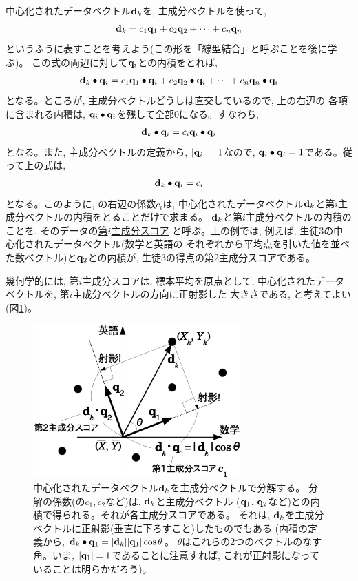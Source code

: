 中心化されたデータベクトル${\bf d}_k$を, 主成分ベクトルを使って, 
\begin{eqnarray}
{\bf d}_k=c_1{\bf q}_1+c_2{\bf q}_2+\cdots+c_n{\bf q}_n\label{eq:PCA_lincomp}
\end{eqnarray}
というふうに表すことを考えよう(この形を「線型結合」と呼ぶことを後に学ぶ)。
この式の両辺に対して${\bf q}_i$との内積をとれば, 
\begin{eqnarray}
{\bf d}_k\bullet {\bf q}_i=c_1{\bf q}_1\bullet {\bf q}_i+c_2{\bf q}_2\bullet {\bf q}_i+\cdots+c_n{\bf q}_n\bullet {\bf q}_i\nonumber\\
\end{eqnarray}
となる。ところが, 主成分ベクトルどうしは直交しているので, 上の右辺の
各項に含まれる内積は, ${\bf q}_i\bullet {\bf q}_i$を残して全部0になる。すなわち, 
\begin{eqnarray}
{\bf d}_k\bullet {\bf q}_i=c_i{\bf q}_i\bullet {\bf q}_i
\end{eqnarray}
となる。また, 主成分ベクトルの定義から, $|{\bf q}_i|=1$なので, ${\bf q}_i\bullet{\bf q}_i=1$である。従って上の式は, 
\begin{eqnarray}
{\bf d}_k\bullet {\bf q}_i=c_i
\end{eqnarray}
となる。このように, の右辺の係数$c_i$は, 
中心化されたデータベクトル${\bf d}_k$と第$i$主成分ベクトルの内積をとることだけで求まる。
${\bf d}_k$と第$i$主成分ベクトルの内積のことを, そのデータの\underline{第$i$主成分スコア}
と呼ぶ。上の例では, 例えば, 生徒3の中心化されたデータベクトル(数学と英語の
それぞれから平均点を引いた値を並べた数ベクトル)と${\bf q}_2$との内積が, 
生徒3の得点の第2主成分スコアである。

幾何学的には, 第$i$主成分スコアは, 標本平均を原点として, 
中心化されたデータベクトルを, 第$i$主成分ベクトルの方向に正射影した
大きさである, と考えてよい(図\ref{fig:PCA_shaei})。

\begin{figure}
    \centering
    \includegraphics[width=8cm]{PCA_shaei.eps}
    \caption{中心化されたデータベクトル${\bf d}_k$を主成分ベクトルで分解する。
分解の係数(の$c_1, c_2$など)は, ${\bf d}_k$と主成分ベクトル
(${\bf q}_1$, ${\bf q}_2$など)との内積で得られる。それが各主成分スコアである。
それは, ${\bf d}_k$を主成分ベクトルに正射影(垂直に下ろすこと)したものでもある
(内積の定義から, ${\bf d}_k\bullet{\bf q}_1=|{\bf d}_k||{\bf q}_1|\cos\theta$。
$\theta$はこれらの2つのベクトルのなす角。いま, $|{\bf q}_1|=1$であることに注意すれば, 
これが正射影になっていることは明らかだろう)。\label{fig:PCA_shaei}}
\end{figure}


